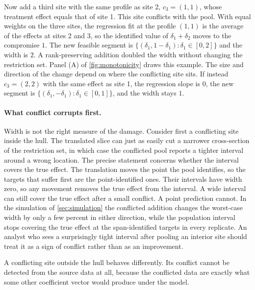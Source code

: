 Now add a third site with the same profile as site 2, $c_3=(1,1)$, whose
treatment effect equals that of site 1. This site conflicts with the
pool. With equal weights on the three sites, the regression fit at the
profile $(1,1)$ is the average of the effects at sites 2 and 3, so the
identified value of $\delta_1+\delta_2$ moves to the compromise $1$. The
new feasible segment is $\{(\delta_1,1-\delta_1):\delta_1\in[0,2]\}$ and
the width is $2$. A rank-preserving addition doubled the width without
changing the restriction set. Panel (A) of \cref{fig:monotonicity} draws
this example. The size and direction of the change depend on where the
conflicting site sits. If instead $c_3=(2,2)$ with the same effect as
site 1, the regression slope is $0$, the new segment is
$\{(\delta_1,-\delta_1):\delta_1\in[0,1]\}$, and the width stays $1$.

\paragraph{What conflict corrupts first.}
Width is not the right measure of the damage. Consider first a
conflicting site inside the hull. The translated slice can
just as easily cut a narrower cross-section of the restriction set, in
which case the conflicted pool reports a tighter interval around a wrong
location. The precise statement concerns whether the interval covers the true
effect. The translation moves the point the pool identifies, so the
targets that suffer first are the point-identified ones. Their intervals
have width zero, so any movement removes the true effect from the
interval. A wide interval can still cover the true effect after a small
conflict. A point prediction cannot. In the simulation of
\cref{sec:simulation} the conflicted addition changes the worst-case
width by only a few percent in either direction, while the population
interval stops covering the true effect at the span-identified targets
in every replicate. An analyst who sees a surprisingly tight interval after pooling an
interior site should treat it as a sign of conflict rather than as an
improvement.

A conflicting site outside the hull behaves differently. Its conflict
cannot be detected from the source data at all, because the conflicted
data are exactly what some other coefficient vector would produce under
the model.

